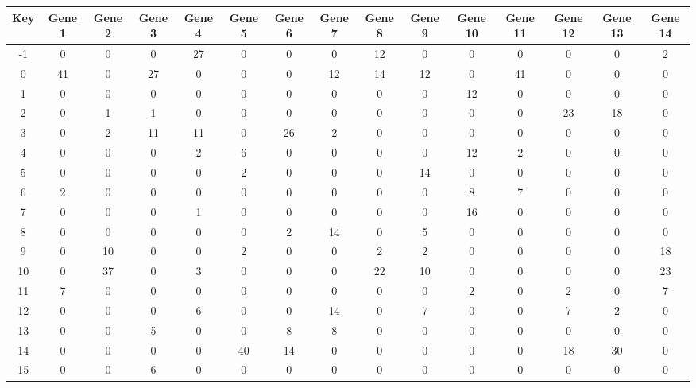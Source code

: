 \begin{tabular}{|c|c|c|c|c|c|c|c|c|c|c|c|c|c|c|}
\hline
Key & Gene 1 & Gene 2 & Gene 3 & Gene 4 & Gene 5 & Gene 6 & Gene 7 & Gene 8 & Gene 9 & Gene 10 & Gene 11 & Gene 12 & Gene 13 & Gene 14 \\
\hline
-1 & 0 & 0 & 0 & 27 & 0 & 0 & 0 & 12 & 0 & 0 & 0 & 0 & 0 & 2 \\
0 & 41 & 0 & 27 & 0 & 0 & 0 & 12 & 14 & 12 & 0 & 41 & 0 & 0 & 0 \\
1 & 0 & 0 & 0 & 0 & 0 & 0 & 0 & 0 & 0 & 12 & 0 & 0 & 0 & 0 \\
2 & 0 & 1 & 1 & 0 & 0 & 0 & 0 & 0 & 0 & 0 & 0 & 23 & 18 & 0 \\
3 & 0 & 2 & 11 & 11 & 0 & 26 & 2 & 0 & 0 & 0 & 0 & 0 & 0 & 0 \\
4 & 0 & 0 & 0 & 2 & 6 & 0 & 0 & 0 & 0 & 12 & 2 & 0 & 0 & 0 \\
5 & 0 & 0 & 0 & 0 & 2 & 0 & 0 & 0 & 14 & 0 & 0 & 0 & 0 & 0 \\
6 & 2 & 0 & 0 & 0 & 0 & 0 & 0 & 0 & 0 & 8 & 7 & 0 & 0 & 0 \\
7 & 0 & 0 & 0 & 1 & 0 & 0 & 0 & 0 & 0 & 16 & 0 & 0 & 0 & 0 \\
8 & 0 & 0 & 0 & 0 & 0 & 2 & 14 & 0 & 5 & 0 & 0 & 0 & 0 & 0 \\
9 & 0 & 10 & 0 & 0 & 2 & 0 & 0 & 2 & 2 & 0 & 0 & 0 & 0 & 18 \\
10 & 0 & 37 & 0 & 3 & 0 & 0 & 0 & 22 & 10 & 0 & 0 & 0 & 0 & 23 \\
11 & 7 & 0 & 0 & 0 & 0 & 0 & 0 & 0 & 0 & 2 & 0 & 2 & 0 & 7 \\
12 & 0 & 0 & 0 & 6 & 0 & 0 & 14 & 0 & 7 & 0 & 0 & 7 & 2 & 0 \\
13 & 0 & 0 & 5 & 0 & 0 & 8 & 8 & 0 & 0 & 0 & 0 & 0 & 0 & 0 \\
14 & 0 & 0 & 0 & 0 & 40 & 14 & 0 & 0 & 0 & 0 & 0 & 18 & 30 & 0 \\
15 & 0 & 0 & 6 & 0 & 0 & 0 & 0 & 0 & 0 & 0 & 0 & 0 & 0 & 0 \\
\hline
\end{tabular}